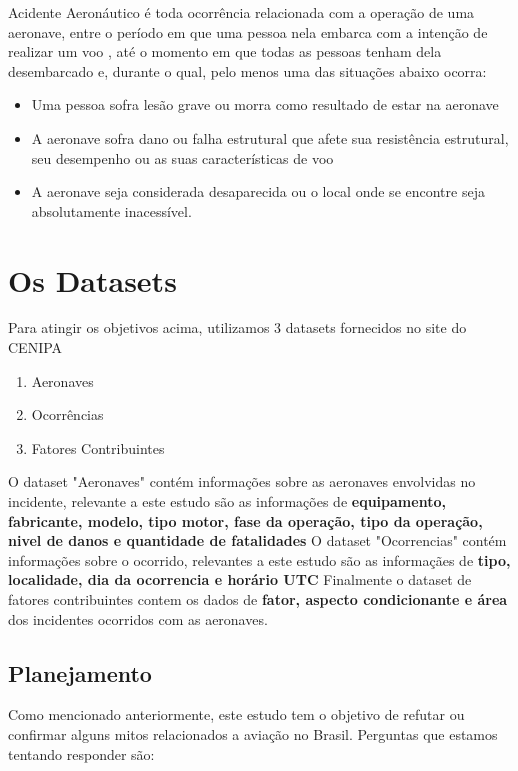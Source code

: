 \documentclass[conference]{IEEEtran}
\begin{document}
Acidente Aeronáutico é toda ocorrência relacionada com a operação de uma aeronave, entre o período em que uma pessoa nela embarca com a intenção de realizar um voo
, até o momento em que todas as pessoas tenham dela desembarcado e, durante o qual, pelo menos uma das situações abaixo ocorra: \\

\begin{itemize}
 \item Uma pessoa sofra lesão grave ou morra como resultado de estar na aeronave
 \item A aeronave sofra dano ou falha estrutural que afete sua resistência estrutural, seu desempenho ou as suas características de voo
 \item A aeronave seja considerada desaparecida ou o local onde se encontre seja absolutamente inacessível.
\end{itemize}

\section{Os Datasets}

Para atingir os objetivos acima, utilizamos 3 datasets fornecidos no site do CENIPA

\begin{enumerate}
 \item Aeronaves
 \item Ocorrências
 \item Fatores Contribuintes
\end{enumerate}

O dataset "Aeronaves" contém informações sobre as aeronaves envolvidas no incidente, relevante a este estudo são as informações de \textbf{equipamento, fabricante, modelo, 
tipo motor, fase da operação, tipo da operação, nivel de danos e quantidade de fatalidades}
O dataset "Ocorrencias" contém informações sobre o ocorrido, relevantes a este estudo são as informaçães de \textbf{ tipo, localidade, dia da ocorrencia e horário UTC  }
Finalmente o dataset de fatores contribuintes contem os dados de \textbf{ fator, aspecto condicionante e área } dos incidentes ocorridos com as aeronaves.

\subsection{Planejamento}

Como mencionado anteriormente, este estudo tem o objetivo de refutar ou confirmar alguns mitos relacionados a aviação no Brasil. Perguntas que estamos tentando
responder são: 
\end{document}
